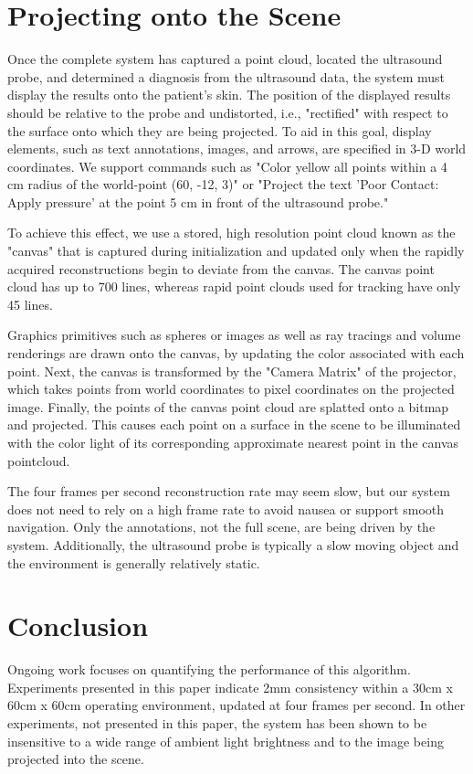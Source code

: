 \documentclass{llncs}
\begin{document}
\section{Projecting onto the Scene}

Once the complete system has captured a point cloud, located the ultrasound probe, and determined a diagnosis from the ultrasound data, the system must display the results onto the patient's skin. The position of the displayed results should be relative to the probe and undistorted, i.e., "rectified" with respect to the surface onto which they are being projected. To aid in this goal, display elements, such as text annotations, images, and arrows, are specified in 3-D world coordinates. We support commands such as "Color yellow all points within a 4 cm radius of the world-point (60, -12, 3)" or "Project the text 'Poor Contact: Apply pressure' at the point 5 cm in front of the ultrasound probe."

To achieve this effect, we use a stored, high resolution point cloud known as the "canvas" that is captured during initialization and updated only when the rapidly acquired reconstructions begin to deviate from the canvas. The canvas point cloud has up to 700 lines, whereas rapid point clouds used for tracking have only 45 lines. 

Graphics primitives such as spheres or images as well as ray tracings and volume renderings are drawn onto the canvas, by updating the color associated with each point. Next, the canvas is transformed by the "Camera Matrix" of the projector, which takes points from world coordinates to pixel coordinates on the projected image. Finally, the points of the canvas point cloud are splatted onto a bitmap and projected. This causes each point on a surface in the scene to be illuminated with the color light of its corresponding approximate nearest point in the canvas pointcloud. 

The four frames per second reconstruction rate may seem slow, but our system does not need to rely on a high frame rate to avoid nausea or support smooth navigation. Only the annotations, not the full scene, are being driven by the system. Additionally, the ultrasound probe is typically a slow moving object and the environment is generally relatively static.


\section{Conclusion}
Ongoing work focuses on quantifying the performance of this algorithm.  Experiments presented in this paper indicate 2mm consistency within a 30cm x 60cm x 60cm operating environment, updated at four frames per second.  In other experiments, not presented in this paper, the system has been shown to be insensitive to a wide range of ambient light brightness and to the image being projected into the scene.
\end{document}
